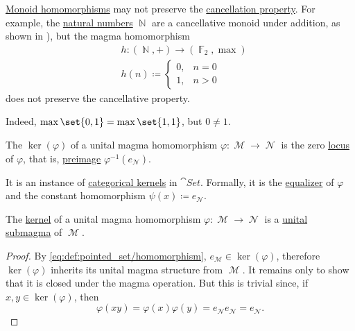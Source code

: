 \begin{example}\label{ex:monoid_cancellation_not_preserved_by_homomorphism}
  \hyperref[def:unital_magma/homomorphism]{Monoid homomorphisms} may not preserve the \hyperref[def:magma/cancellative]{cancellation property}. For example, the \hyperref[def:set_of_natural_numbers]{natural numbers} \( \BbbN \) are a cancellative monoid under addition, as shown in ), but the magma homomorphism
  \begin{equation*}
    \begin{aligned}
      &h: (\BbbN, +) \to (\hyperref[thm:galois_field_existence]{\BbbF_2}, \max) \\
      &h(n) \coloneqq \begin{cases}
        0, &n = 0 \\
        1, &n > 0
      \end{cases}
    \end{aligned}
  \end{equation*}
  does not preserve the cancellative property.

  Indeed, \( \max\set{ 0, 1} = \max\set{ 1, 1 } \), but \( 0 \neq 1 \).
\end{example}

\begin{definition}\label{def:unital_magma_kernel}
  The  \( \ker(\varphi) \) of a unital magma homomorphism \( \varphi: \mscrM \to \mscrN \) is the zero \hyperref[def:zero_locus]{locus} of \( \varphi \), that is, \hyperref[thm:def:function/properties/preimage]{preimage} \( \varphi^{-1}(e_{\mscrN}) \).

  It is an instance of \hyperref[def:zero_morphisms/kernel]{categorical kernels} in \hyperref[def:category_of_small_sets]{\( \cat{Set} \)}. Formally, it is the \hyperref[eq:def:equalizers/equalizer]{equalizer} of \( \varphi \) and the constant homomorphism \( \psi(x) \coloneqq e_{\mscrN} \).
\end{definition}

\begin{proposition}\label{thm:unital_magma_kernel_is_submagma}
  The \hyperref[def:unital_magma_kernel]{kernel} of a unital magma homomorphism \( \varphi: \mscrM \to \mscrN \) is a \hyperref[def:first_order_substructure]{unital submagma} of \( \mscrM \).
\end{proposition}
\begin{proof}
  By \eqref{eq:def:pointed_set/homomorphism}, \( e_{\mscrM} \in \ker(\varphi) \), therefore \( \ker(\varphi) \) inherits its unital magma structure from \( \mscrM \). It remains only to show that it is closed under the magma operation. But this is trivial since, if \( x, y \in \ker(\varphi) \), then
  \begin{equation*}
    \varphi(xy) = \varphi(x) \varphi(y) = e_{\mscrN} e_{\mscrN} = e_{\mscrN}.
  \end{equation*}
\end{proof}
